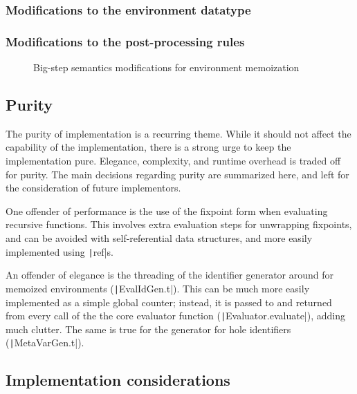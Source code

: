 \subsubsection{Modifications to the environment datatype}
\label{sec:memoization-evalenv}

\subsubsection{Modifications to the post-processing rules}
\label{sec:memoization-postprocessing}

\begin{figure}
  \centering
  \begin{mdframed}
    \begin{singlespace}
      
    \end{singlespace}
  \end{mdframed}
  \caption{Big-step semantics modifications for environment memoization}
  \label{fig:big-step-memoization-rules}
\end{figure}

\subsection{Purity}
\label{sec:env-purity}
The purity of implementation is a recurring theme. While it should not affect the capability of the implementation, there is a strong urge to keep the implementation pure. Elegance, complexity, and runtime overhead is traded off for purity. The main decisions regarding purity are summarized here, and left for the consideration of future implementors.

One offender of performance is the use of the fixpoint form when evaluating recursive functions. This involves extra evaluation steps for unwrapping fixpoints, and can be avoided with self-referential data structures, and more easily implemented using \texttt|ref|s.

An offender of elegance is the threading of the identifier generator around for memoized environments (\texttt|EvalIdGen.t|). This can be much more easily implemented as a simple global counter; instead, it is passed to and returned from every call of the the core evaluator function (\texttt|Evaluator.evaluate|), adding much clutter. The same is true for the generator for hole identifiers (\texttt|MetaVarGen.t|).

\subsection{Implementation considerations}
\label{sec:evalenv_impl_considerations}


